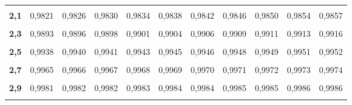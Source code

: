 \documentclass[
  11pt,
  ngerman,
  a4paper,
]{report}
\begin{document}
\begin{table}[!h]
{\begin{tabular}{>{}r|rrrrrrrrrr}
\addlinespace
\textbf{\cellcolor{gray!6}{2,0}} & \cellcolor{gray!6}{0,9772} & \cellcolor{gray!6}{0,9778} & \cellcolor{gray!6}{0,9783} & \cellcolor{gray!6}{0,9788} & \cellcolor{gray!6}{0,9793} & \cellcolor{gray!6}{0,9798} & \cellcolor{gray!6}{0,9803} & \cellcolor{gray!6}{0,9808} & \cellcolor{gray!6}{0,9812} & \cellcolor{gray!6}{0,9817}\\
\textbf{2,1} & 0,9821 & 0,9826 & 0,9830 & 0,9834 & 0,9838 & 0,9842 & 0,9846 & 0,9850 & 0,9854 & 0,9857\\
\textbf{\cellcolor{gray!6}{2,2}} & \cellcolor{gray!6}{0,9861} & \cellcolor{gray!6}{0,9864} & \cellcolor{gray!6}{0,9868} & \cellcolor{gray!6}{0,9871} & \cellcolor{gray!6}{0,9875} & \cellcolor{gray!6}{0,9878} & \cellcolor{gray!6}{0,9881} & \cellcolor{gray!6}{0,9884} & \cellcolor{gray!6}{0,9887} & \cellcolor{gray!6}{0,9890}\\
\textbf{2,3} & 0,9893 & 0,9896 & 0,9898 & 0,9901 & 0,9904 & 0,9906 & 0,9909 & 0,9911 & 0,9913 & 0,9916\\
\textbf{\cellcolor{gray!6}{2,4}} & \cellcolor{gray!6}{0,9918} & \cellcolor{gray!6}{0,9920} & \cellcolor{gray!6}{0,9922} & \cellcolor{gray!6}{0,9925} & \cellcolor{gray!6}{0,9927} & \cellcolor{gray!6}{0,9929} & \cellcolor{gray!6}{0,9931} & \cellcolor{gray!6}{0,9932} & \cellcolor{gray!6}{0,9934} & \cellcolor{gray!6}{0,9936}\\
\addlinespace
\textbf{2,5} & 0,9938 & 0,9940 & 0,9941 & 0,9943 & 0,9945 & 0,9946 & 0,9948 & 0,9949 & 0,9951 & 0,9952\\
\textbf{\cellcolor{gray!6}{2,6}} & \cellcolor{gray!6}{0,9953} & \cellcolor{gray!6}{0,9955} & \cellcolor{gray!6}{0,9956} & \cellcolor{gray!6}{0,9957} & \cellcolor{gray!6}{0,9959} & \cellcolor{gray!6}{0,9960} & \cellcolor{gray!6}{0,9961} & \cellcolor{gray!6}{0,9962} & \cellcolor{gray!6}{0,9963} & \cellcolor{gray!6}{0,9964}\\
\textbf{2,7} & 0,9965 & 0,9966 & 0,9967 & 0,9968 & 0,9969 & 0,9970 & 0,9971 & 0,9972 & 0,9973 & 0,9974\\
\textbf{\cellcolor{gray!6}{2,8}} & \cellcolor{gray!6}{0,9974} & \cellcolor{gray!6}{0,9975} & \cellcolor{gray!6}{0,9976} & \cellcolor{gray!6}{0,9977} & \cellcolor{gray!6}{0,9977} & \cellcolor{gray!6}{0,9978} & \cellcolor{gray!6}{0,9979} & \cellcolor{gray!6}{0,9979} & \cellcolor{gray!6}{0,9980} & \cellcolor{gray!6}{0,9981}\\
\textbf{2,9} & 0,9981 & 0,9982 & 0,9982 & 0,9983 & 0,9984 & 0,9984 & 0,9985 & 0,9985 & 0,9986 & 0,9986\\
\addlinespace
\textbf{\cellcolor{gray!6}{3,0}} & \cellcolor{gray!6}{0,9987} & \cellcolor{gray!6}{0,9987} & \cellcolor{gray!6}{0,9987} & \cellcolor{gray!6}{0,9988} & \cellcolor{gray!6}{0,9988} & \cellcolor{gray!6}{0,9989} & \cellcolor{gray!6}{0,9989} & \cellcolor{gray!6}{0,9989} & \cellcolor{gray!6}{0,9990} & \cellcolor{gray!6}{0,9990}\\
\bottomrule
\end{tabular}}
\end{table}
\end{document}
